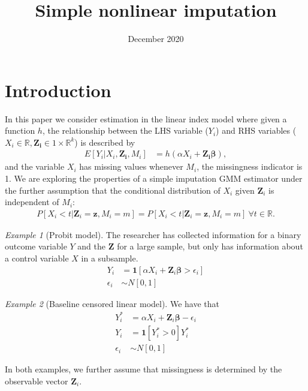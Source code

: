 \documentclass{article}
\title{Simple nonlinear imputation}
\author{}
\date{December 2020}
\theoremstyle{definition}
\theoremstyle{remark}
\newtheorem{example}{Example}
\begin{document}
\maketitle

\onehalfspacing


\section{Introduction}
In this paper we consider estimation in the linear index model where given a function $h$, the relationship between the LHS variable ($Y_i$) and RHS variables ($X_i \in \mathbb{R},\mathbf{Z_i} \in {1} \times \mathbb{R}^k$) is described by
\begin{align}
E[Y_i|X_i,\mathbf{Z_i}, M_i]&= h(\alpha X_i+ \mathbf{Z_i} \mathbf{\beta}),
\end{align}
and the variable $X_i$ has missing values whenever $M_i$, the missingness indicator is 1. We are exploring the properties of a simple imputation GMM estimator under the further assumption that the conditional distribution of $X_i$ given $\mathbf{Z}_i$ is independent of $M_i$:
\begin{align}
P[X_i <t|\mathbf{Z}_i=\mathbf{z}, M_i=m]= P[X_i <t|\mathbf{Z}_i=\mathbf{z}, M_i=m] \ \forall t \in \mathbb{R}.
\end{align}

\begin{example}[Probit model]
	The researcher has collected information for a binary outcome variable $Y$ and the $\mathbf{Z}$ for a large sample, but only has information about a control variable $X$ in a subsample.
	\begin{align*}
	Y_i&= \mathbf{1}[\alpha X_i + \mathbf{Z}_i\mathbf{\beta}>\epsilon_i]\\
	\epsilon_i&\sim N[0,1]
	\end{align*}
\end{example}

\begin{example}[Baseline censored linear model]
	We have that
	\begin{align*}
	Y_i^*&=\alpha X_i + \mathbf{Z}_i\mathbf{\beta}-\epsilon_i \\
	Y_i&= \mathbf{1}[Y_i^*>0]Y_i^* \\
	\epsilon_i&\sim N[0,1]
	\end{align*}
\end{example}
In both examples, we further assume that missingness is determined by the observable vector $\mathbf{Z}_i$. 
\end{document}
